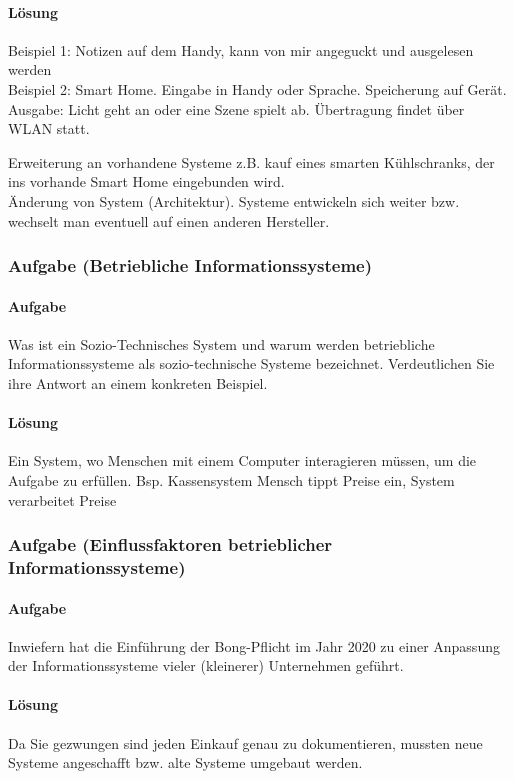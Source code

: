 \paragraph*{Lösung}
    Beispiel 1: Notizen auf dem Handy, kann von mir angeguckt und ausgelesen werden \\
    Beispiel 2: Smart Home. Eingabe in Handy oder Sprache. Speicherung auf Gerät. Ausgabe: Licht geht an oder eine Szene spielt ab. Übertragung findet über WLAN statt. 
    
    Erweiterung an vorhandene Systeme z.B. kauf eines smarten Kühlschranks, der ins vorhande Smart Home eingebunden wird. \\
    Änderung von System (Architektur). Systeme entwickeln sich weiter bzw. wechselt man eventuell auf einen anderen Hersteller.

\subsubsection*{Aufgabe (Betriebliche Informationssysteme)}
\paragraph*{Aufgabe}
    Was ist ein Sozio-Technisches System und warum werden betriebliche Informationssysteme als sozio-technische Systeme bezeichnet. Verdeutlichen Sie ihre Antwort an einem konkreten Beispiel.
\paragraph*{Lösung}
    Ein System, wo Menschen mit einem Computer interagieren müssen, um die Aufgabe zu erfüllen. Bsp. Kassensystem \textrightarrow Mensch tippt Preise ein, System verarbeitet Preise

\subsubsection*{Aufgabe (Einflussfaktoren betrieblicher Informationssysteme)}
\paragraph*{Aufgabe}
    Inwiefern hat die Einführung der Bong-Pflicht im Jahr 2020 zu einer Anpassung der Informationssysteme vieler (kleinerer) Unternehmen geführt.
\paragraph*{Lösung}
    Da Sie gezwungen sind jeden Einkauf genau zu dokumentieren, mussten neue Systeme angeschafft bzw. alte Systeme umgebaut werden.

